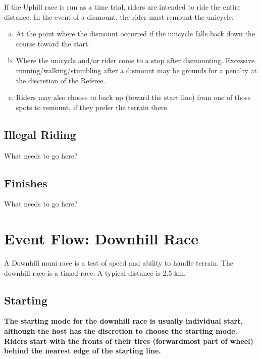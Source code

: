 If the Uphill race is run as a time trial, riders are intended to ride the entire distance.
In the event of a dismount, the rider must remount the unicycle:
\begin{enumerate}[(a)]
\item At the point where the dismount occurred if the unicycle falls back down the course toward the start.
\item Where the unicycle and/or rider come to a stop after dismounting.
Excessive running/walking/stumbling after a dismount may be grounds for a
penalty at the discretion of the Referee.
\item Riders may also choose to back up (toward the start line) from one of those spots to remount, if they prefer the terrain there.
\end{enumerate}


\subsection{Illegal Riding}

\begin{framed}
What needs to go here?
\end{framed}

\subsection{Finishes}

\begin{framed}
What needs to go here?
\end{framed}

\section{Event Flow: Downhill Race \label{sec:muni_downhill}}

A Downhill muni race is a test of speed and ability to handle terrain. The downhill race is a timed race. A typical distance is 2.5 km.

\subsection{Starting}

\textbf{The starting mode for the downhill race is usually individual 
start, although the host has the discretion to choose the starting 
mode. Riders start with the fronts of their tires (forwardmost part of wheel) behind the nearest edge of the starting line.}

